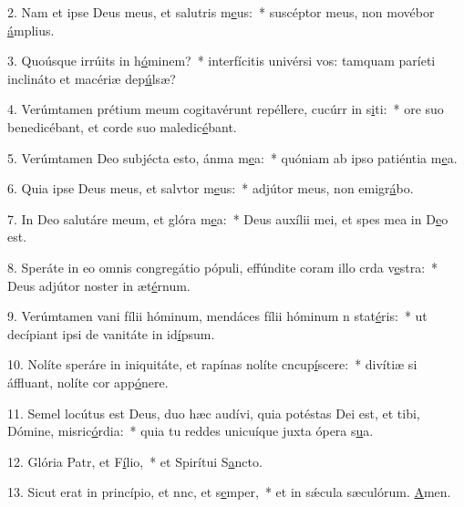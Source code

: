 2. Nam et ipse Deus meus, et salutris m\uline{e}us:~* suscéptor meus, non movébor \uline{á}mplius.\par 
3. Quoúsque irrúits in h\uline{ó}minem?~* interfícitis univérsi vos: tamquam paríeti inclináto et macériæ dep\uline{ú}lsæ?\par 
4. Verúmtamen prétium meum cogitavérunt repéllere, cucúrr in s\uline{i}ti:~* ore suo benedicébant, et corde suo maledic\uline{é}bant.\par 
5. Verúmtamen Deo subjécta esto, ánma m\uline{e}a:~* quóniam ab ipso patiéntia m\uline{e}a.\par 
6. Quia ipse Deus meus, et salvtor m\uline{e}us:~* adjútor meus, non emigr\uline{á}bo.\par 
7. In Deo salutáre meum, et glóra m\uline{e}a:~* Deus auxílii mei, et spes mea in D\uline{e}o est.\par 
8. Speráte in eo omnis congregátio pópuli, effúndite coram illo crda v\uline{e}stra:~* Deus adjútor noster in æt\uline{é}rnum.\par 
9. Verúmtamen vani fílii hóminum, mendáces fílii hóminum n stat\uline{é}ris:~* ut decípiant ipsi de vanitáte in id\uline{í}psum.\par 
10. Nolíte speráre in iniquitáte, et rapínas nolíte cncup\uline{í}scere:~* divítiæ si áffluant, nolíte cor app\uline{ó}nere.\par 
11. Semel locútus est Deus, duo hæc audívi, quia potéstas Dei est, et tibi, Dómine, misric\uline{ó}rdia:~* quia tu reddes unicuíque juxta ópera s\uline{u}a.\par 
12. Glória Patr, et F\uline{í}lio,~* et Spirítui S\uline{a}ncto.\par 
13. Sicut erat in princípio, et nnc, et s\uline{e}mper,~* et in sǽcula sæculórum. \uline{A}men.\par 
